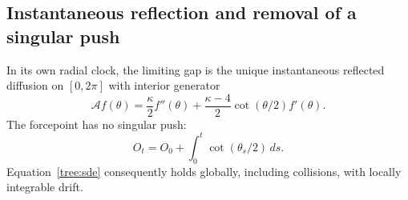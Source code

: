 \subsection{Instantaneous reflection and removal of a singular push}
\label{tree:endpoints}

\begin{proposition}
\label{tree:reflection}
In its own radial clock, the limiting gap is the unique instantaneous
reflected diffusion on $[0,2\pi]$ with interior generator
\begin{equation}\label{tree:generator}
 \mathcal A f(\theta)=\frac\kappa2 f''(\theta)
       +\frac{\kappa-4}{2}\cot(\theta/2)f'(\theta).
\end{equation}
The forcepoint has no singular push:
\begin{equation}\label{tree:no-push}
 O_t=O_0+\int_0^t\cot(\theta_s/2)\,ds.
\end{equation}
Equation~\eqref{tree:sde} consequently holds globally, including
collisions, with locally integrable drift.
\end{proposition}

